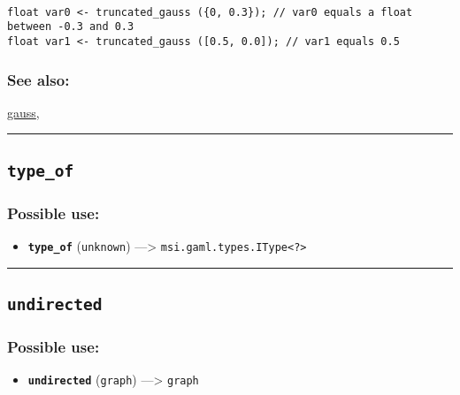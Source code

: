 \documentclass[]{book}
\providecommand{\tightlist}{%
  \setlength{\itemsep}{0pt}\setlength{\parskip}{0pt}}
\theoremstyle{definition}
\theoremstyle{definition}
\theoremstyle{definition}
\theoremstyle{remark}
\begin{document}
\begin{verbatim}
 
float var0 <- truncated_gauss ({0, 0.3}); // var0 equals a float between -0.3 and 0.3 
float var1 <- truncated_gauss ([0.5, 0.0]); // var1 equals 0.5
\end{verbatim}

\subsubsection{See also:}\label{see-also-212}

\href{OperatorsDH\#gauss}{gauss},

\begin{center}\rule{0.5\linewidth}{\linethickness}\end{center}

\subsection{\texorpdfstring{\texttt{type\_of}}{type\_of}}\label{type_of}

\subsubsection{Possible use:}\label{possible-use-536}

\begin{itemize}
\tightlist
\item
  \textbf{\texttt{type\_of}} (\texttt{unknown}) ---\textgreater{}
  \texttt{msi.gaml.types.IType\textless{}?\textgreater{}}
\end{itemize}

\begin{center}\rule{0.5\linewidth}{\linethickness}\end{center}

\subsection{\texorpdfstring{\texttt{undirected}}{undirected}}\label{undirected}

\subsubsection{Possible use:}\label{possible-use-537}

\begin{itemize}
\tightlist
\item
  \textbf{\texttt{undirected}} (\texttt{graph}) ---\textgreater{}
  \texttt{graph}
\end{itemize}
\end{document}

